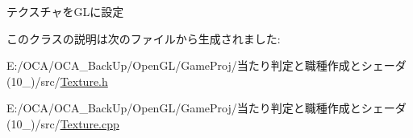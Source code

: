 テクスチャを\-G\-Lに設定 



このクラスの説明は次のファイルから生成されました\-:\begin{DoxyCompactItemize}
\item 
E\-:/\-O\-C\-A/\-O\-C\-A\-\_\-\-Back\-Up/\-Open\-G\-L/\-Game\-Proj/当たり判定と職種作成とシェーダ(10\-\_)/src/\hyperlink{_texture_8h}{Texture.\-h}\item 
E\-:/\-O\-C\-A/\-O\-C\-A\-\_\-\-Back\-Up/\-Open\-G\-L/\-Game\-Proj/当たり判定と職種作成とシェーダ(10\-\_)/src/\hyperlink{_texture_8cpp}{Texture.\-cpp}\end{DoxyCompactItemize}
